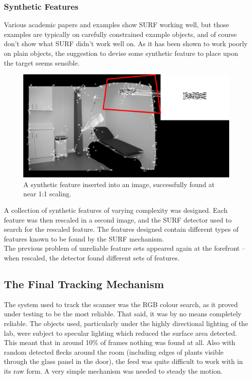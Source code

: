 \subsubsection{Synthetic Features}
Various academic papers and examples show SURF working well, but those examples are typically on carefully constrained example objects, and of course don’t show what SURF didn’t work well on. As it has been shown to work poorly on plain objects, the suggestion to devise some synthetic feature to place upon the target seems sensible. \\

\begin{figure}
\begin{center}
    \includegraphics[scale=0.25]{images/synthetic_features_1.png}
    \caption{A synthetic feature inserted into an image, successfully found at near 1:1 scaling.}
\end{center}
\end{figure}

A collection of synthetic features of varying complexity was designed. Each feature was then rescaled in a second image, and the SURF detector used to search for the rescaled feature. The features designed contain different types of features known to be found by the SURF mechanism. \\

The previous problem of unreliable feature sets appeared again at the forefront – when rescaled, the detector found different sets of features. \\

\subsection{The Final Tracking Mechanism}
The system used to track the scanner was the RGB colour search, as it proved under testing to be the most reliable. That said, it was by no means completely reliable. The objects used, particularly under the highly directional lighting of the lab, were subject to specular lighting which reduced the surface area detected. This meant that in around 10\% of frames nothing was found at all. Also with random detected flecks around the room (including edges of plants visible through the glass panel in the door), the feed was quite difficult to work with in its raw form. A very simple mechanism was needed to steady the motion.\\

